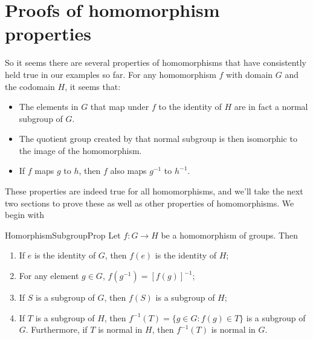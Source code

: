 



 

 

\section{Proofs of homomorphism properties}
\label{sec:Homomorphism:ProofProperties}

So it seems there are several properties of homomorphisms that have consistently held true in our examples so far.  
For any  homomorphism $f$ with domain $G$ and the codomain $H$, it seems that:


\begin{itemize}
\item
The elements in $G$ that map under $f$ to the identity of $H$ are in fact a normal subgroup of $G$.
\item
The quotient group created by that normal subgroup is then isomorphic to the image of the homomorphism.
\item
If $f$ maps $g$ to $h$, then $f$ also maps $g^{-1}$ to $h^{-1}$.
\end{itemize}

These properties are indeed true for all homomorphisms, and we'll take the next two sections to prove these as well as other properties of homomorphisms.  
We begin with 
 
\begin{prop}{HomorphismSubgroupProp}
Let $f : G \rightarrow H$ be a homomorphism of groups. Then 
\begin{enumerate}
 
\item
If $e$ is the identity of $G$, then $f( e)$ is the identity of
$H$;  
 
\item
For any element $g \in G$, $f( g^{-1}) = [f( g )]^{- 1}$;
 
\item
If $S$ is a subgroup of $G$, then $f(S )$ is a subgroup of
$H$;
 
\item \label{normal_kernel}
If $T$ is a  subgroup of $H$, then $f^{-1}(T) = \{ g \in G :
f(g) \in T \}$ is a subgroup of $G$. Furthermore, if $T$ is
normal in $H$, then $f^{-1}(T)$ is normal in $G$. 
 
\end{enumerate}
\end{prop}
 
